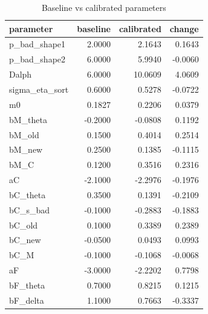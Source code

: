 \begin{table}

\caption{Baseline vs calibrated parameters}
\centering
\begin{tabular}[t]{lrrr}
\toprule
parameter & baseline & calibrated & change\\
\midrule
p\_bad\_shape1 & 2.0000 & 2.1643 & 0.1643\\
p\_bad\_shape2 & 6.0000 & 5.9940 & -0.0060\\
Dalph & 6.0000 & 10.0609 & 4.0609\\
sigma\_eta\_sort & 0.6000 & 0.5278 & -0.0722\\
m0 & 0.1827 & 0.2206 & 0.0379\\
bM\_theta & -0.2000 & -0.0808 & 0.1192\\
bM\_old & 0.1500 & 0.4014 & 0.2514\\
bM\_new & 0.2500 & 0.1385 & -0.1115\\
bM\_C & 0.1200 & 0.3516 & 0.2316\\
aC & -2.1000 & -2.2976 & -0.1976\\
bC\_theta & 0.3500 & 0.1391 & -0.2109\\
bC\_s\_bad & -0.1000 & -0.2883 & -0.1883\\
bC\_old & 0.1000 & 0.3389 & 0.2389\\
bC\_new & -0.0500 & 0.0493 & 0.0993\\
bC\_M & -0.1000 & -0.1068 & -0.0068\\
aF & -3.0000 & -2.2202 & 0.7798\\
bF\_theta & 0.7000 & 0.8215 & 0.1215\\
bF\_delta & 1.1000 & 0.7663 & -0.3337\\
\bottomrule
\end{tabular}
\end{table}
